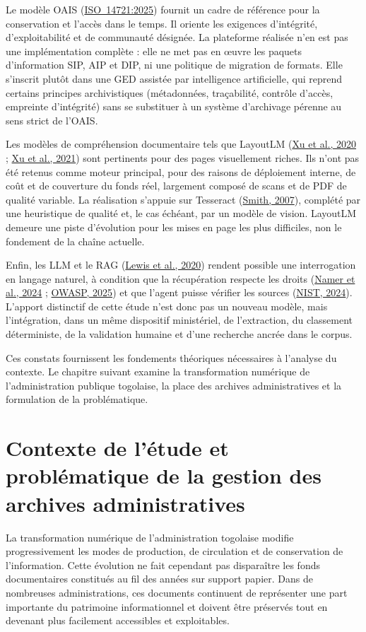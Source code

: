 \documentclass[12pt,a4paper]{report}
\newcommand{\citer}[2]{\hyperref[ref:#1]{#2}}
\begin{document}
Le modèle OAIS (\citer{iso14721}{\mbox{ISO 14721:2025}}) fournit un cadre de référence pour la conservation et l'accès dans le temps. Il oriente les exigences d'intégrité, d'exploitabilité et de communauté désignée. La plateforme réalisée n'en est pas une implémentation complète : elle ne met pas en œuvre les paquets d'information SIP, AIP et DIP, ni une politique de migration de formats. Elle s'inscrit plutôt dans une GED assistée par intelligence artificielle, qui reprend certains principes archivistiques (métadonnées, traçabilité, contrôle d'accès, empreinte d'intégrité) sans se substituer à un système d'archivage pérenne au sens strict de l'OAIS.

Les modèles de compréhension documentaire tels que LayoutLM (\citer{xu2020}{Xu et al., 2020} ; \citer{xu2021}{Xu et al., 2021}) sont pertinents pour des pages visuellement riches. Ils n'ont pas été retenus comme moteur principal, pour des raisons de déploiement interne, de coût et de couverture du fonds réel, largement composé de scans et de PDF de qualité variable. La réalisation s'appuie sur Tesseract (\citer{smith2007}{Smith, 2007}), complété par une heuristique de qualité et, le cas échéant, par un modèle de vision. LayoutLM demeure une piste d'évolution pour les mises en page les plus difficiles, non le fondement de la chaîne actuelle.

Enfin, les LLM et le RAG (\citer{lewis2020}{Lewis et al., 2020}) rendent possible une interrogation en langage naturel, à condition que la récupération respecte les droits (\citer{namer2024}{Namer et al., 2024} ; \citer{owasp2025}{OWASP, 2025}) et que l'agent puisse vérifier les sources (\citer{nist2024}{NIST, 2024}). L'apport distinctif de cette étude n'est donc pas un nouveau modèle, mais l'intégration, dans un même dispositif ministériel, de l'extraction, du classement déterministe, de la validation humaine et d'une recherche ancrée dans le corpus.

Ces constats fournissent les fondements théoriques nécessaires à l'analyse du contexte. Le chapitre suivant examine la transformation numérique de l'administration publique togolaise, la place des archives administratives et la formulation de la problématique.

\chapter[Contexte de l'étude]{Contexte de l'étude et problématique de la gestion des archives administratives}
\label{ch:contexte}
La transformation numérique de l'administration togolaise modifie progressivement les modes de production, de circulation et de conservation de l'information. Cette évolution ne fait cependant pas disparaître les fonds documentaires constitués au fil des années sur support papier. Dans de nombreuses administrations, ces documents continuent de représenter une part importante du patrimoine informationnel et doivent être préservés tout en devenant plus facilement accessibles et exploitables.
\end{document}
